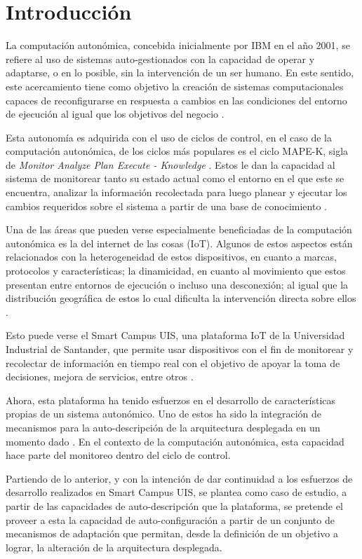 \section*{Introducción}


La computación autonómica, concebida inicialmente por IBM en el año 2001, se refiere al uso de sistemas auto-gestionados con la capacidad de operar y adaptarse, o en lo posible, sin la intervención de un ser humano. En este sentido, este acercamiento tiene como objetivo la creación de sistemas computacionales capaces de reconfigurarse en respuesta a cambios en las condiciones del entorno de ejecución al igual que los objetivos del negocio \cite{horn_2001}.

Esta autonomía es adquirida con el uso de ciclos de control, en el caso de la computación autonómica, de los ciclos más populares es el ciclo MAPE-K, sigla de \textit{Monitor Analyze Plan Execute - Knowledge} \cite{Arcaini_2015}. Estos le dan la capacidad al sistema de monitorear tanto su estado actual como el entorno en el que este se encuentra, analizar la información recolectada para luego planear y ejecutar los cambios requeridos sobre el sistema a partir de una base de conocimiento \cite{RutanenKalle2018McoO}.

Una de las áreas que pueden verse especialmente beneficiadas de la computación autonómica es la del internet de las cosas (IoT). Algunos de estos aspectos están relacionados con la heterogeneidad de estos dispositivos, en cuanto a marcas, protocolos y características; la dinamicidad, en cuanto al movimiento que estos presentan entre entornos de ejecución o incluso una desconexión; al igual que la distribución geográfica de estos lo cual dificulta la intervención directa sobre ellos \cite{Tahir_2019}. 

Esto puede verse el Smart Campus UIS, una plataforma IoT de la Universidad Industrial de Santander, que permite usar dispositivos con el fin de monitorear y recolectar de información en tiempo real con el objetivo de apoyar la toma de decisiones, mejora de servicios, entre otros \cite{henry_2020}.

Ahora, esta plataforma ha tenido esfuerzos en el desarrollo de características propias de un sistema autonómico. Uno de estos ha sido la integración de mecanismos para la auto-descripción de la arquitectura desplegada en un momento dado \cite{msc_henry_2022}. En el contexto de la computación autonómica, esta capacidad hace parte del monitoreo dentro del ciclo de control. 

Partiendo de lo anterior, y con la intención de dar continuidad a los esfuerzos de desarrollo realizados en Smart Campus UIS, se plantea como caso de estudio, a partir de las capacidades de auto-descripción que la plataforma, se pretende el proveer a esta la capacidad de auto-configuración a partir de un conjunto de mecanismos de adaptación que permitan, desde la definición de un objetivo a lograr, la alteración de la arquitectura desplegada. 